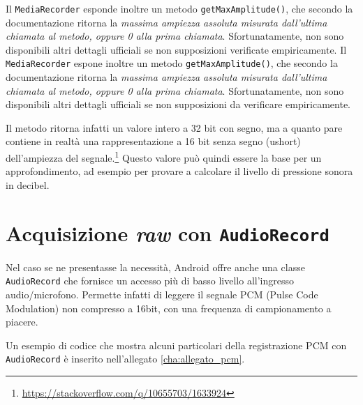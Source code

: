 
Il \texttt{MediaRecorder} esponde inoltre un metodo \texttt{getMaxAmplitude()}, che secondo la documentazione\footnotemark{} ritorna la \emph{massima ampiezza assoluta misurata dall'ultima chiamata al metodo, oppure 0 alla prima chiamata}. Sfortunatamente, non sono disponibili altri dettagli ufficiali se non supposizioni verificate empiricamente.
Il \texttt{MediaRecorder} espone inoltre un metodo \texttt{getMaxAmplitude()}, che secondo la documentazione\footnotemark{} ritorna la \emph{massima ampiezza assoluta misurata dall'ultima chiamata al metodo, oppure 0 alla prima chiamata}. Sfortunatamente, non sono disponibili altri dettagli ufficiali se non supposizioni da verificare empiricamente.


Il metodo ritorna infatti un valore intero a 32 bit con segno, ma a quanto pare contiene in realtà una rappresentazione a 16 bit senza segno (ushort) dell'ampiezza del segnale.\footnote{\url{https://stackoverflow.com/q/10655703/1633924}} Questo valore può quindi essere la base per un approfondimento, ad esempio per provare a calcolare il livello di pressione sonora in decibel.

\section{Acquisizione \emph{raw} con \texttt{AudioRecord}}
\label{sec:audio_audiorecord}

Nel caso se ne presentasse la necessità, Android offre anche una classe \texttt{AudioRecord} che fornisce un accesso più di basso livello all'ingresso audio/microfono. Permette infatti di leggere il segnale PCM (Pulse Code Modulation) non compresso a 16bit, con una frequenza di campionamento a piacere.

Un esempio di codice che mostra alcuni particolari della registrazione PCM con \texttt{AudioRecord} è inserito nell'allegato \ref{cha:allegato_pcm}.

